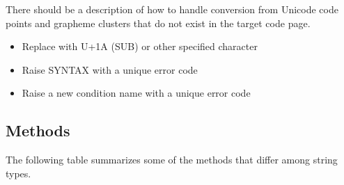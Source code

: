\documentclass[b4paper]{article}
\begin{document}
There should be a description of how to handle conversion from Unicode code
points and grapheme clusters that do not exist in the target code page.
\begin{itemize}
\item Replace with U+1A (SUB) or other specified character
\item Raise SYNTAX with a unique error code
\item Raise a new condition name with a unique error code
\end{itemize}

\subsection{Methods}
The following table summarizes some of the methods that differ among string types.
\end{document}
